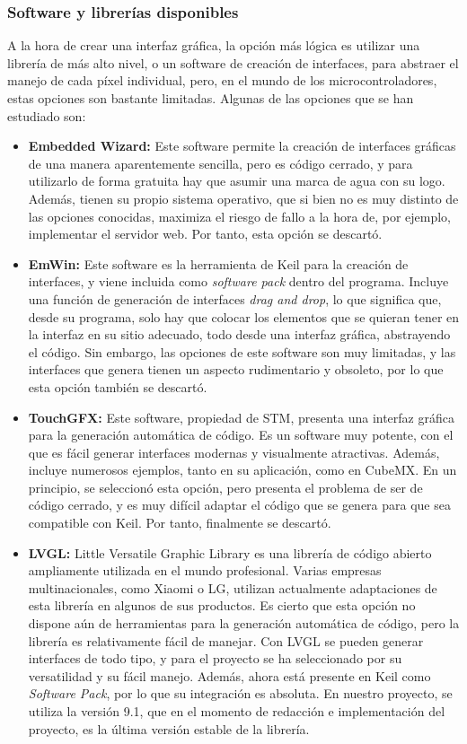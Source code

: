 \subsubsection{Software y librerías disponibles}
A la hora de crear una interfaz gráfica, la opción más lógica es utilizar una librería de más alto nivel, o un software de creación de interfaces, para abstraer el manejo de cada píxel individual, pero, en el mundo de los microcontroladores, estas opciones son bastante limitadas. Algunas de las opciones que se han estudiado son:
\begin{itemize}
  \item \textbf{Embedded Wizard:} Este software permite la creación de interfaces gráficas de una manera aparentemente sencilla, pero es código cerrado, y para utilizarlo de forma gratuita hay que asumir una marca de agua con su logo. Además, tienen su propio sistema operativo, que si bien no es muy distinto de las opciones conocidas, maximiza el riesgo de fallo a la hora de, por ejemplo, implementar el servidor web. Por tanto, esta opción se descartó.
  \item \textbf{EmWin:} Este software es la herramienta de Keil para la creación de interfaces, y viene incluida como \textit{software pack} dentro del programa. Incluye una función de generación de interfaces \textit{drag and drop}, lo que significa que, desde su programa, solo hay que colocar los elementos que se quieran tener en la interfaz en su sitio adecuado, todo desde una interfaz gráfica, abstrayendo el código. Sin embargo, las opciones de este software son muy limitadas, y las interfaces que genera tienen un aspecto rudimentario y obsoleto, por lo que esta opción también se descartó.
  \item \textbf{TouchGFX:} Este software, propiedad de STM, presenta una interfaz gráfica para la generación automática de código. Es un software muy potente, con el que es fácil generar interfaces modernas y visualmente atractivas. Además, incluye numerosos ejemplos, tanto en su aplicación, como en CubeMX. En un principio, se seleccionó esta opción, pero presenta el problema de ser de código cerrado, y es muy difícil adaptar el código que se genera para que sea compatible con Keil. Por tanto, finalmente se descartó.
  \item \textbf{LVGL:} Little Versatile Graphic Library es una librería de código abierto ampliamente utilizada en el mundo profesional. Varias empresas multinacionales, como Xiaomi o LG, utilizan actualmente adaptaciones de esta librería en algunos de sus productos. Es cierto que esta opción no dispone aún de herramientas para la generación automática de código, pero la librería es relativamente fácil de manejar. Con LVGL se pueden generar interfaces de todo tipo, y para el proyecto se ha seleccionado por su versatilidad y su fácil manejo. Además, ahora está presente en Keil como \textit{Software Pack}, por lo que su integración es absoluta. En nuestro proyecto, se utiliza la versión 9.1, que en el momento de redacción e implementación del proyecto, es la última versión estable de la librería.
\end{itemize}
